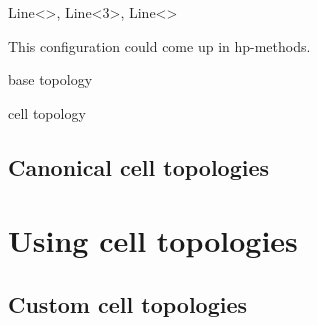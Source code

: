 \documentclass[pdf,12pt,relaxed]{SANDreport}
\begin{document}
Line<>, Line<3>, Line<>

This configuration could come up in hp-methods.

    
    
    base topology
    
    cell topology

    
    
    
    \subsection{Canonical cell topologies}\label{sec:canonical}
    
     

   \section{Using cell topologies}\label{sec:using}


    \subsection{Custom cell topologies}\label{sec:custom}



    \clearpage
    \providecommand*{\phantomsection}{}
    \phantomsection
    
    
    
\end{document}
